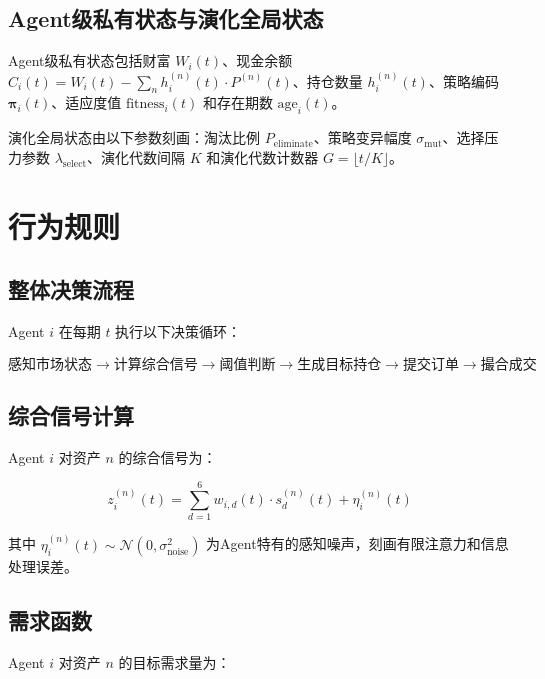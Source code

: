 \subsection{Agent级私有状态与演化全局状态}

Agent级私有状态包括财富 $W_i(t)$、现金余额 $C_i(t) = W_i(t) - \sum_n h_i^{(n)}(t) \cdot P^{(n)}(t)$、持仓数量 $h_i^{(n)}(t)$、策略编码 $\boldsymbol{\pi}_i(t)$、适应度值 $\text{fitness}_i(t)$ 和存在期数 $\text{age}_i(t)$。

演化全局状态由以下参数刻画：淘汰比例 $P_{\text{eliminate}}$、策略变异幅度 $\sigma_{\text{mut}}$、选择压力参数 $\lambda_{\text{select}}$、演化代数间隔 $K$ 和演化代数计数器 $G = \lfloor t/K \rfloor$。

\section{行为规则}

\subsection{整体决策流程}

Agent $i$ 在每期 $t$ 执行以下决策循环：

\begin{equation}
\text{感知市场状态} \to \text{计算综合信号} \to \text{阈值判断} \to \text{生成目标持仓} \to \text{提交订单} \to \text{撮合成交}
\label{eq:decision_loop}
\end{equation}

\subsection{综合信号计算}

Agent $i$ 对资产 $n$ 的综合信号为：

\begin{equation}
z_i^{(n)}(t) = \sum_{d=1}^{6} w_{i,d}(t) \cdot s_d^{(n)}(t) + \eta_i^{(n)}(t)
\label{eq:composite_signal}
\end{equation}

其中 $\eta_i^{(n)}(t) \sim \mathcal{N}(0, \sigma_{\text{noise}}^2)$ 为Agent特有的感知噪声，刻画有限注意力和信息处理误差。

\subsection{需求函数}

Agent $i$ 对资产 $n$ 的目标需求量为：

